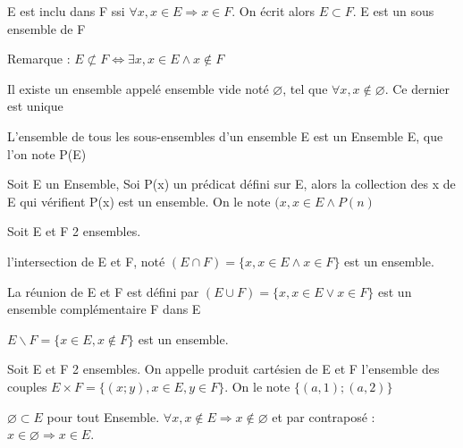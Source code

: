 \documentclass[french]{yLectureNote}
\begin{document}
\begin{theorem}[Inclusion]
E est inclu dans F ssi $\forall x, x \in E \Rightarrow x \in F$. On écrit alors $E \subset F$. E est un sous ensemble de F
\end{theorem}



Remarque : $E \not\subset F \iff \exists x, x \in E \wedge x \notin F$

\begin{axiom}
Il existe un ensemble appelé ensemble vide  noté $\varnothing$, tel que $\forall x, x \notin \varnothing$. Ce dernier est unique
\end{axiom}

\begin{axiom}[Parties de E]
L'ensemble de tous les sous-ensembles d'un ensemble E est un Ensemble E, que l'on note P(E)
\end{axiom}

\begin{axiom}
Soit E un Ensemble, Soi P(x) un prédicat défini sur E, alors la collection des x de E qui vérifient P(x) est un ensemble. On le note $(x, x \in E \wedge P(n)$
\end{axiom}

\begin{theorem}[Conséquence]
Soit E et F 2 ensembles.

l'intersection de E et F, noté $(E \cap F) = \{x, x \in E \wedge x\in F\}$ est un ensemble.

La réunion de E et F est défini par $(E \cup F) = \{x, x \in E \vee x\in F\}$ est un ensemble complémentaire F dans E

$E \backslash F = \{x \in E, x \notin F\}$ est un ensemble.
\end{theorem}

\begin{axiom}
Soit E et F 2 ensembles. On appelle produit cartésien de E et F l'ensemble des couples $E\times F = \{(x;y), x\in E, y \in F\}$. On le note $\{(a,1);(a,2)\}$
\end{axiom}

\begin{theorem}[Propriété]
$\varnothing \subset E$ pour tout Ensemble. $\forall x, x \notin E \Rightarrow x \notin \varnothing$ et par contraposé : $x\in \varnothing \Rightarrow x \in E$.
\end{theorem}

\end{document}
